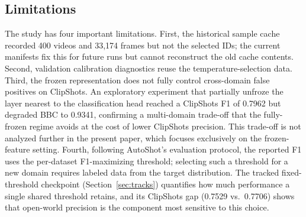 \subsection{Limitations}

The study has four important limitations. First, the historical sample cache recorded 400
videos and 33,174 frames but not the selected IDs; the current manifests fix
this for future runs but cannot reconstruct the old cache contents. Second,
validation calibration diagnostics reuse the temperature-selection data. Third,
the frozen representation does not fully control cross-domain false
positives on ClipShots. An exploratory experiment that partially unfroze the
layer nearest to the classification head reached a ClipShots F1 of 0.7962
but degraded BBC to 0.9341, confirming a multi-domain trade-off that the
fully-frozen regime avoids at the cost of lower ClipShots precision. This
trade-off is not analyzed further in the present paper, which focuses
exclusively on the frozen-feature setting.
Fourth, following AutoShot's evaluation protocol, the reported F1 uses the per-dataset F1-maximizing threshold; selecting such a threshold for a new domain requires labeled data from the target distribution. The tracked fixed-threshold checkpoint (Section~\ref{sec:tracks}) quantifies how much performance a single shared threshold retains, and its ClipShots gap (0.7529 vs.\ 0.7706) shows that open-world precision is the component most sensitive to this choice.

